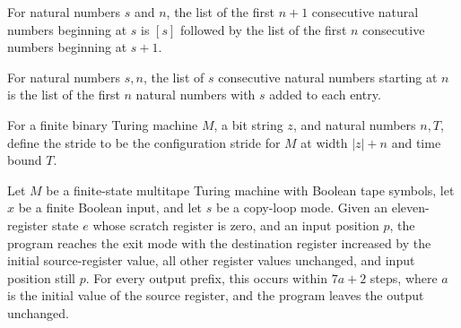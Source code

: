 \begin{theorem}
\label{Complexity.UTab.range'_succ_left}
\leanok
{}
For natural numbers $s$ and $n$, the list of the first $n+1$ consecutive natural numbers
beginning at $s$ is $[s]$ followed by the list of the first $n$ consecutive numbers
beginning at $s+1$.
\end{theorem}

\begin{theorem}
\label{Complexity.UTab.range'_eq_map}
\leanok
{}
For natural numbers $s,n$, the list of $s$ consecutive natural numbers starting at $n$
is the list of the first $n$ natural numbers with $s$ added to each entry.
\end{theorem}

\begin{definition}
\label{Complexity.UTab.Str}
\leanok
{}
For a finite binary Turing machine $M$, a bit string $z$, and natural numbers $n,T$,
define the stride to be the configuration stride for $M$ at width $|z|+n$ and time bound
$T$.
\end{definition}

\begin{theorem}
\label{Complexity.UTab.goes_copyR}
\leanok
{}
Let $M$ be a finite-state multitape Turing machine with Boolean tape symbols, let $x$ be
a finite Boolean input, and let $s$ be a copy-loop mode. Given an eleven-register state
$e$ whose scratch register is zero, and an input position $p$, the program reaches the
exit mode with the destination register increased by the initial source-register value,
all other register values unchanged, and input position still $p$. For every output
prefix, this occurs within $7a+2$ steps, where $a$ is the initial value of the source
register, and the program leaves the output unchanged.
\end{theorem}

